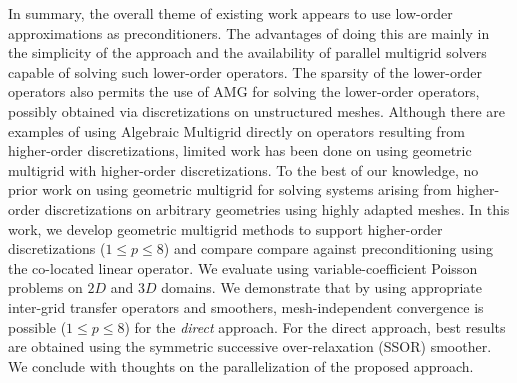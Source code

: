 \documentclass{report}
\begin{document}
In summary, the overall theme of existing work appears to use low-order
approximations as preconditioners. The advantages of doing this are
mainly in the simplicity of the approach and the availability of parallel
multigrid solvers capable of solving such lower-order operators. The
sparsity of the lower-order operators also permits the use of AMG for
solving the lower-order operators, possibly obtained
via discretizations on unstructured meshes. Although there are examples
of using Algebraic Multigrid directly on operators resulting from
higher-order discretizations, limited work has been done on using
geometric multigrid with higher-order discretizations. To the best of our
knowledge, no prior work on using geometric multigrid for solving systems
arising from higher-order discretizations on arbitrary
geometries using highly adapted meshes. In this work, we develop
geometric multigrid methods to support higher-order discretizations
($1\le p\le 8$) and compare compare against preconditioning using the
co-located linear operator. We evaluate using variable-coefficient
Poisson problems on $2D$ and $3D$ domains. We demonstrate that by using
appropriate inter-grid transfer operators and smoothers,
mesh-independent convergence is possible ($1\le p\le8$) for the {\em
direct} approach. For the direct approach, best results are obtained
using the symmetric successive over-relaxation (SSOR) smoother. We
conclude with thoughts on the parallelization of the proposed approach.
\end{document}
